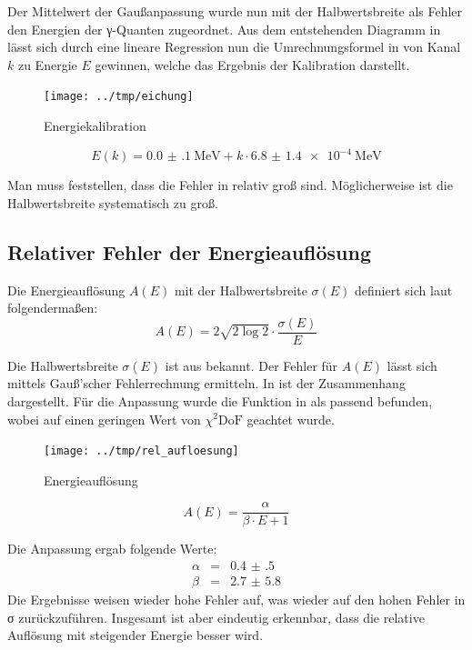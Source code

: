 Der Mittelwert der Gaußanpassung wurde nun mit der Halbwertsbreite als Fehler
den Energien der γ-Quanten zugeordnet. Aus dem entstehenden Diagramm in
 lässt sich durch eine lineare Regression nun die
Umrechnungsformel in  von Kanal $k$ zu Energie $E$ gewinnen,
welche das Ergebnis der Kalibration darstellt.

\begin{figure}[htb]
      \centering
      \texttt{[image: ../tmp/eichung]}
      \caption{Energiekalibration}
      \label{fig:eichung}
\end{figure}

\begin{equation}
 E(k) = \SI{0.0(1)}{\mega\eV} + k\cdot\SI{6.8(14)e-4}{\mega\eV}
 \label{eqn:eichung}
\end{equation}

Man muss feststellen, dass die Fehler in  relativ groß sind.
Möglicherweise ist die Halbwertsbreite systematisch zu groß.

\subsection{Relativer Fehler der Energieauflösung}

Die Energieauflösung $A(E)$ mit der Halbwertsbreite $σ(E)$
definiert sich laut \cite{script} folgendermaßen:
\begin{equation}
 A(E) = 2\sqrt{2\log{2}}\cdot\frac{σ(E)}{E}
 \label{eqn:energie_aufloesung}
\end{equation}

Die Halbwertsbreite $σ(E)$ ist aus  bekannt. Der Fehler
für $A(E)$ lässt sich mittels Gauß’scher Fehlerrechnung ermitteln. In
 ist der Zusammenhang dargestellt. Für die Anpassung
wurde die Funktion in  als passend befunden,
wobei auf einen geringen Wert von $\chi^2\mathrm{DoF}$ geachtet wurde.

\begin{figure}[htb]
      \centering
      \texttt{[image: ../tmp/rel\_aufloesung]}
      \caption{Energieauflösung}
      \label{fig:rel_aufloesung}
\end{figure}

\begin{equation}
 A(E) = \frac{\alpha}{\beta \cdot E + 1}
 \label{eqn:rel_aufloesung_anpassung}
\end{equation}

Die Anpassung ergab folgende Werte:
\begin{eqnarray}
 \alpha &=& \num{0.4(5)}  \\
 \beta &=& \num{2.7(58)}
\end{eqnarray}
Die Ergebnisse weisen wieder hohe Fehler auf, was wieder auf den hohen Fehler
in σ zurückzuführen. Insgesamt ist aber eindeutig erkennbar, dass die relative
Auflösung mit steigender Energie besser wird.


